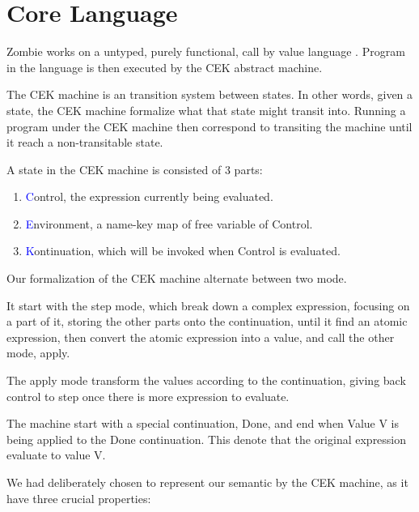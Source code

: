 \section{Core Language}	
Zombie works on a untyped, purely functional, call by value language . Program in the language is then executed by the CEK abstract machine.

The CEK machine is an transition system between states. In other words, given a state, the CEK machine formalize what that state might transit into. Running a program under the CEK machine then correspond to transiting the machine until it reach a non-transitable state.

A state in the CEK machine is consisted of 3 parts:

\begin{enumerate}
	\item \textcolor{blue}{C}ontrol, the expression currently being evaluated.
	\item \textcolor{blue}{E}nvironment, a name-key map of free variable of Control.
	\item \textcolor{blue}{K}ontinuation, which will be invoked when Control is evaluated.
\end{enumerate}

Our formalization of the CEK machine alternate between two mode.

It start with the step mode, which break down a complex expression, focusing on a part of it, storing the other parts onto the continuation, until it find an atomic expression, then convert the atomic expression into a value, and call the other mode, apply.

The apply mode transform the values according to the continuation, giving back control to step once there is more expression to evaluate.

The machine start with a special continuation, Done, and end when Value V is being applied to the Done continuation. This denote that the original expression evaluate to value V.

We had deliberately chosen to represent our semantic by the CEK machine, as it have three crucial properties:

